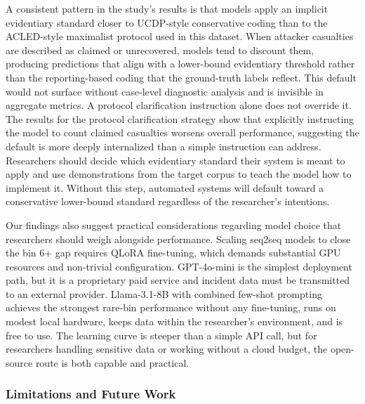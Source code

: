 \documentclass[
  11pt,
]{article}
\begin{document}
A consistent pattern in the study's results is that models apply an
implicit evidentiary standard closer to UCDP-style conservative coding
than to the ACLED-style maximalist protocol used in this dataset. When
attacker casualties are described as claimed or unrecovered, models tend
to discount them, producing predictions that align with a lower-bound
evidentiary threshold rather than the reporting-based coding that the
ground-truth labels reflect. This default would not surface without
case-level diagnostic analysis and is invisible in aggregate metrics. A
protocol clarification instruction alone does not override it. The
results for the protocol clarification strategy show that explicitly
instructing the model to count claimed casualties worsens overall
performance, suggesting the default is more deeply internalized than a
simple instruction can address. Researchers should decide which
evidentiary standard their system is meant to apply and use
demonstrations from the target corpus to teach the model how to
implement it. Without this step, automated systems will default toward a
conservative lower-bound standard regardless of the researcher's
intentions.

Our findings also suggest practical considerations regarding model
choice that researchers should weigh alongside performance. Scaling
seq2seq models to close the bin 6+ gap requires QLoRA fine-tuning, which
demands substantial GPU resources and non-trivial configuration.
GPT-4o-mini is the simplest deployment path, but it is a proprietary
paid service and incident data must be transmitted to an external
provider. Llama-3.1-8B with combined few-shot prompting achieves the
strongest rare-bin performance without any fine-tuning, runs on modest
local hardware, keeps data within the researcher's environment, and is
free to use. The learning curve is steeper than a simple API call, but
for researchers handling sensitive data or working without a cloud
budget, the open-source route is both capable and practical.

\subsubsection{Limitations and Future
Work}\label{limitations-and-future-work}
\end{document}
